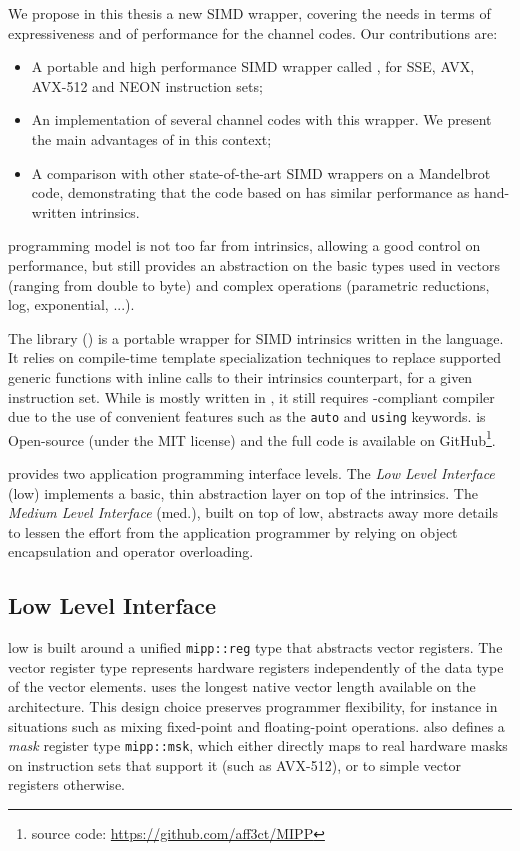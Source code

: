We propose in this thesis a new \Cxx SIMD wrapper, covering the needs in terms
of expressiveness and of performance for the channel codes. Our contributions
are:
\begin{itemize}
  \item A portable and high performance  \Cxx SIMD wrapper called \MIPP, for
    SSE, AVX, AVX-512 and NEON instruction sets;
  \item An implementation of several channel codes with this wrapper. We
    present the main advantages of \MIPP in this context;
  \item A comparison with other state-of-the-art SIMD wrappers on a Mandelbrot
    code, demonstrating that the code based on \MIPP has similar performance as
    hand-written intrinsics.
\end{itemize}
\MIPP programming model is not too far from intrinsics, allowing a good control
on performance, but still provides an abstraction on the basic types used in
vectors (ranging from double to byte) and complex operations (parametric
reductions, log, exponential, ...).

The \longMIPP library (\MIPP) is a portable wrapper for SIMD intrinsics written
in the \Cxx language. It relies on \Cxx compile-time template specialization
techniques to replace supported generic functions with inline calls to their
intrinsics counterpart, for a given instruction set. While \MIPP is mostly
written in , it still requires -compliant compiler due to the
use of convenient features such as the \verb|auto| and \verb|using| keywords.
\MIPP is Open-source (under the MIT license) and the full code is available on
GitHub\footnote{\MIPP source code: \url{https://github.com/aff3ct/MIPP}}.

\MIPP provides two application programming interface levels. The
\emph{Low Level Interface} (low) implements a basic, thin abstraction layer on
top of the intrinsics. The \emph{Medium Level Interface} (med.), built on top of
\MIPP low, abstracts away more details to lessen the effort from the application
programmer by relying on object encapsulation and operator overloading.

\subsection{Low Level Interface}

\MIPP low is built around a unified \verb|mipp::reg| type that abstracts vector
registers. The vector register type represents hardware registers independently
of the data type of the vector elements. \MIPP uses the longest native vector
length available on the architecture. This design choice preserves programmer
flexibility, for instance in situations such as mixing fixed-point and
floating-point operations. \MIPP also defines a \emph{mask} register type
\verb|mipp::msk|, which either directly maps to real hardware masks on
instruction sets that support it (such as AVX-512), or to simple vector
registers otherwise.

